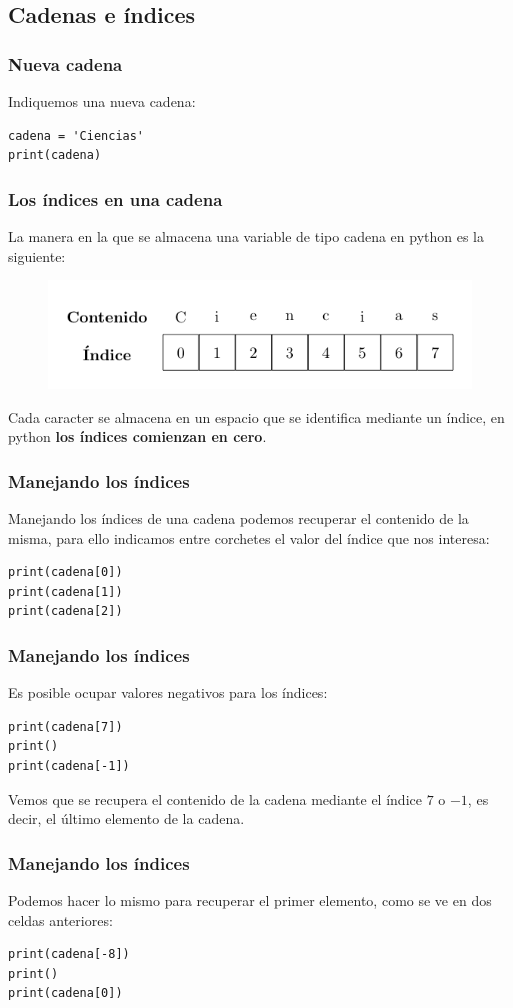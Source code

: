 \documentclass[12pt]{beamer}
\begin{document}
\subsection{Cadenas e índices}

\begin{frame}[fragile]
\frametitle{Nueva cadena}
Indiquemos una nueva cadena:
\begin{lstlisting}[caption=Nueva cadena]
cadena = 'Ciencias'
print(cadena)
\end{lstlisting}
\end{frame}
\begin{frame}
\frametitle{Los índices en una cadena}
La manera en la que se almacena una variable de tipo cadena en python es la siguiente:
\pause
\begin{figure}
    \centering
    \includegraphics[scale=1]{Imagenes/variablecadena01.png}
\end{figure}
\pause
Cada caracter se almacena en un espacio que se identifica mediante un índice, en python \textbf{los índices comienzan en cero}.
\end{frame}
\begin{frame}[fragile]
\frametitle{Manejando los índices}
Manejando los índices de una cadena podemos recuperar el contenido de la misma, para ello indicamos entre corchetes el valor del índice que nos interesa:
\pause
\begin{lstlisting}[caption=Usando índices en una cadena]
print(cadena[0])
print(cadena[1])
print(cadena[2])
\end{lstlisting}
\end{frame}
\begin{frame}[fragile]
\frametitle{Manejando los índices}
Es posible ocupar valores negativos para los índices:
\pause
\begin{lstlisting}[caption=Usando índices negativos]
print(cadena[7])
print()
print(cadena[-1])
\end{lstlisting}
\pause
Vemos que se recupera el contenido de la cadena mediante el índice $7$ o $-1$, es decir, el último elemento de la cadena.
\end{frame}
\begin{frame}[fragile]
\frametitle{Manejando los índices}
Podemos hacer lo mismo para recuperar el primer elemento, como se ve en dos celdas anteriores:
\pause
\begin{lstlisting}[caption=Usando índices negativos y el primer elemento]
print(cadena[-8])
print()
print(cadena[0])
\end{lstlisting}
\end{frame}
\end{document}

